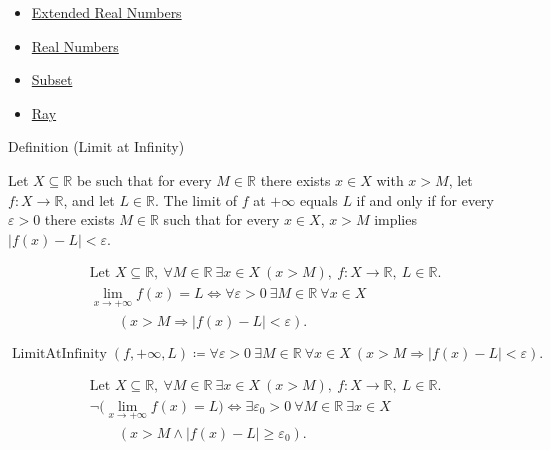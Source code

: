 \begin{dependencies}
\begin{itemize}
  \item \hyperref[def:extended-real-numbers]{Extended Real Numbers}
  \item \hyperref[def:reals]{Real Numbers}
  \item \hyperref[def:subset]{Subset}
  \item \hyperref[def:ray]{Ray}
\end{itemize}
\end{dependencies}
\begin{definitionbox}{Definition (Limit at Infinity)}
\begin{definition}
\label{def:limit-at-infinity}
Let $X \subseteq \mathbb{R}$ be such that for every $M \in \mathbb{R}$ there exists $x \in X$ with $x > M$, let $f : X \to \mathbb{R}$, and let $L \in \mathbb{R}$. The limit of $f$ at $+\infty$ equals $L$ if and only if
for every $\varepsilon > 0$ there exists $M \in \mathbb{R}$ such that for every $x \in X$, $x > M$ implies $|f(x) - L| < \varepsilon$.
\end{definition}
\end{definitionbox}

\begin{remark*}
\[
\begin{aligned}
&\text{Let } X \subseteq \mathbb{R},\ \forall M \in \mathbb{R}\ \exists x \in X\ (x > M),\ f : X \to \mathbb{R},\ L \in \mathbb{R}.\\
&\lim_{x \to +\infty} f(x) = L \Longleftrightarrow \forall \varepsilon > 0\ \exists M \in \mathbb{R}\ \forall x \in X\\
&\qquad (x > M \Rightarrow |f(x) - L| < \varepsilon).
\end{aligned}
\]
\end{remark*}

\begin{remark*}
\[
\operatorname{LimitAtInfinity}(f,+\infty,L) \coloneqq \forall \varepsilon > 0\ \exists M \in \mathbb{R}\ \forall x \in X\ (x > M \Rightarrow |f(x) - L| < \varepsilon).
\]
\end{remark*}

\begin{remark*}
\[
\begin{aligned}
&\text{Let } X \subseteq \mathbb{R},\ \forall M \in \mathbb{R}\ \exists x \in X\ (x > M),\ f : X \to \mathbb{R},\ L \in \mathbb{R}.\\
&\neg\bigl(\lim_{x \to +\infty} f(x) = L\bigr) \Longleftrightarrow \exists \varepsilon_0 > 0\ \forall M \in \mathbb{R}\ \exists x \in X\\
&\qquad (x > M \land |f(x) - L| \ge \varepsilon_0).
\end{aligned}
\]
\end{remark*}

